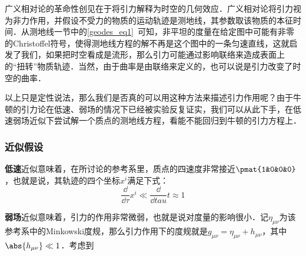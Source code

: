 

广义相对论的革命性创见在于将引力解释为时空的几何效应．广义相对论将引力视为非力作用，并假设不受力的物质的运动轨迹是测地线，其参数取该物质的本征时间．从测地线一节中的\autoref{geodes_eq1}~可知，非平坦的度量在给定图中可能有非零的Christoffel符号，使得测地线方程的解不再是这个图中的一条匀速直线，这就启发了我们，如果把时空看成是流形，那么引力可能通过影响联络来造成表面上的“扭转”物质轨迹．当然，由于曲率是由联络来定义的，也可以说是引力改变了时空的曲率．

以上只是定性说法，那么我们是否真的可以用这种方法来描述引力作用呢？由于牛顿的引力论在低速、弱场的情况下已经被实验反复证实，我们可以从此下手，在低速弱场近似下尝试解一个质点的测地线方程，看能不能回归到牛顿的引力方程上．

\subsubsection{近似假设}

\textbf{低速}近似意味着，在所讨论的参考系里，质点的四速度非常接近$\pmat{1&0&0&0}$，也就是说，其轨迹的四个坐标$x^i$满足下式：
\begin{equation}
\frac{\dd}{\dd \tau}x^i\ll \frac{\dd}{\dd tau}t\approx 1
\end{equation}

\textbf{弱场}近似意味着，引力的作用非常微弱，也就是说对度量的影响很小．记$\eta_{\mu\nu}$为该参考系中的Minkowski度规，那么引力作用下的度规就是$g_{\mu\nu}=\eta_{\mu\nu}+h_{\mu\nu}$，其中$\abs{h_{\mu\nu}}\ll 1$．考虑到






















